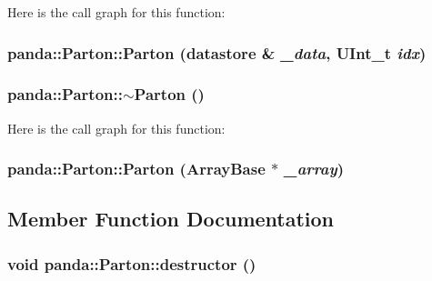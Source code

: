 Here is the call graph for this function:\hypertarget{classpanda_1_1Parton_a1ec13895afc9363dde4ad087f872d1b3}{
\subsubsection[{Parton}]{\setlength{\rightskip}{0pt plus 5cm}panda::Parton::Parton ({\bf datastore} \& {\em \_\-data}, \/  UInt\_\-t {\em idx})}}
\label{classpanda_1_1Parton_a1ec13895afc9363dde4ad087f872d1b3}
\hypertarget{classpanda_1_1Parton_a5cb68db7a6813b2403a918d303c04e53}{
\subsubsection[{$\sim$Parton}]{\setlength{\rightskip}{0pt plus 5cm}panda::Parton::$\sim$Parton ()}}
\label{classpanda_1_1Parton_a5cb68db7a6813b2403a918d303c04e53}


Here is the call graph for this function:\hypertarget{classpanda_1_1Parton_a62acba569cc4187e35b3401e912a3bb5}{
\subsubsection[{Parton}]{\setlength{\rightskip}{0pt plus 5cm}panda::Parton::Parton ({\bf ArrayBase} $\ast$ {\em \_\-array})}}
\label{classpanda_1_1Parton_a62acba569cc4187e35b3401e912a3bb5}


\subsection{Member Function Documentation}
\hypertarget{classpanda_1_1Parton_a54783d8795081067290078d39305e21c}{
\subsubsection[{destructor}]{\setlength{\rightskip}{0pt plus 5cm}void panda::Parton::destructor ()}}
\label{classpanda_1_1Parton_a54783d8795081067290078d39305e21c}


